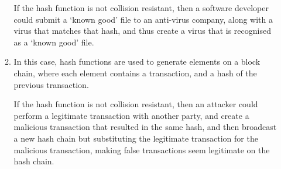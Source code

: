 \begin{enumerate}[label=(\alph*)]
\begin{enumerate}[label=(\roman*)]
        If the hash function is not collision resistant, then a software developer could submit a `known good' file to an anti-virus company, along with a virus that matches that hash, and thus create a virus that is recognised as a `known good' file.

      \item
        In this case, hash functions are used to generate elements on a block chain, where each element contains a transaction, and a hash of the previous transaction.

        If the hash function is not collision resistant, then an attacker could perform a legitimate transaction with another party, and create a malicious transaction that resulted in the same hash, and then broadcast a new hash chain but substituting the legitimate transaction for the malicious transaction, making false transactions seem legitimate on the hash chain.
        
    \end{enumerate}
        
    \end{enumerate}

